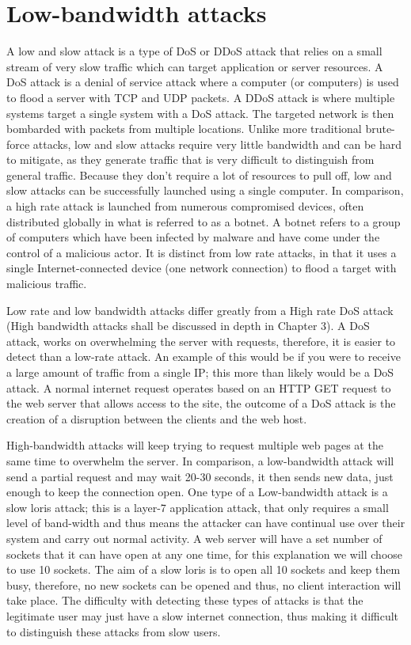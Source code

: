 
\section{Low-bandwidth attacks} \label{attack1}

A low and slow attack is a type of DoS or DDoS attack that relies on a small stream of very slow traffic which can target application or server resources. A DoS attack is a denial of service attack where a computer (or computers) is used to flood a server with TCP and UDP packets. A DDoS attack is where multiple systems target a single system with a DoS attack. The targeted network is then bombarded with packets from multiple locations. Unlike more traditional brute-force attacks, low and slow attacks require very little bandwidth and can be hard to mitigate, as they generate traffic that is very difficult to distinguish from general traffic. Because they don’t require a lot of resources to pull off, low and slow attacks can be successfully launched using a single computer. In comparison, a high rate attack is launched from numerous compromised devices, often distributed globally in what is referred to as a botnet. A botnet refers to a group of computers which have been infected by malware and have come under the control of a malicious actor. It is distinct from low rate attacks, in that it uses a single Internet-connected device (one network connection) to flood a target with malicious traffic. 


Low rate and low bandwidth attacks differ greatly from a High rate DoS attack (High bandwidth attacks shall be discussed in depth in Chapter 3). A DoS attack, works on overwhelming the server with requests, therefore, it is easier to detect than a low-rate attack. An example of this would be if you were to receive a large amount of traffic from a single IP; this more than likely would be a DoS attack. A normal internet request operates based on an HTTP GET request to the web server that allows access to the site, the outcome of a DoS attack is the creation of a disruption between the clients and the web host. 

High-bandwidth attacks will keep trying to request multiple web pages at the same time to overwhelm the server. In comparison, a low-bandwidth attack  will send a partial request and may wait 20-30 seconds, it then sends new data, just enough to keep the connection open. One type of a Low-bandwidth attack is a slow loris attack; this is a layer-7 application attack, that only requires a small level of band-width and thus means the attacker can have continual use over their system and carry out normal activity. A web server will have a set number of sockets that it can have open at any one time, for this explanation we will choose to use 10 sockets. The aim of a slow loris is to open all 10 sockets and keep them busy, therefore, no new sockets can be opened and thus, no client interaction will take place. The difficulty with detecting these types of attacks is that the legitimate user may just have a slow internet connection, thus making it difficult to distinguish these attacks from slow users. 
